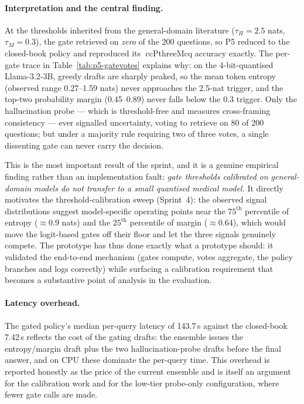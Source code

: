 \paragraph{Interpretation and the central finding.}
At the thresholds inherited from the general-domain literature ($\tau_H=2.5$
nats, $\tau_M=0.3$), the gate retrieved on \emph{zero} of the 200 questions, so
P5 reduced to the closed-book policy and reproduced its ccPthreeMcq{} accuracy exactly.
The per-gate trace in Table~\ref{tab:p5-gatevotes} explains why: on the
4-bit-quantised Llama-3.2-3B, greedy drafts are sharply peaked, so the mean
token entropy (observed range 0.27--1.59 nats) never approaches the 2.5-nat
trigger, and the top-two probability margin (0.45--0.89) never falls below the
0.3 trigger. Only the hallucination probe --- which is threshold-free and
measures cross-framing consistency --- ever signalled uncertainty, voting to
retrieve on 80 of 200 questions; but under a majority rule requiring two of
three votes, a single dissenting gate can never carry the decision.

This is the most important result of the sprint, and it is a genuine empirical
finding rather than an implementation fault: \emph{gate thresholds calibrated
on general-domain models do not transfer to a small quantised medical model.}
It directly motivates the threshold-calibration sweep (Sprint~4): the observed
signal distributions suggest model-specific operating points near the
$75^{\text{th}}$ percentile of entropy ($\approx 0.9$ nats) and the
$25^{\text{th}}$ percentile of margin ($\approx 0.64$), which would move the
logit-based gates off their floor and let the three signals genuinely compete.
The prototype has thus done exactly what a prototype should: it validated the
end-to-end mechanism (gates compute, votes aggregate, the policy branches and
logs correctly) while surfacing a calibration requirement that becomes a
substantive point of analysis in the evaluation.

\paragraph{Latency overhead.}
The gated policy's median per-query latency of 143.7\,s against the
closed-book 7.42\,s reflects the cost of the gating drafts: the ensemble issues
the entropy/margin draft plus the two hallucination-probe drafts before the
final answer, and on CPU these dominate the per-query time. This overhead is
reported honestly as the price of the current ensemble and is itself an
argument for the calibration work and for the low-tier probe-only
configuration, where fewer gate calls are made.
